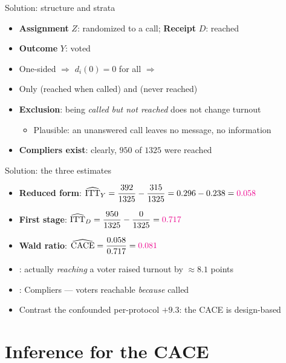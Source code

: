 \documentclass[table, xcolor = {dvipsnames}, 9pt]{beamer}
\theoremstyle{plain}
\newcommand{\mh}[1]{{\color{magenta}{#1}}}
\newcommand{\CACE}{\mathrm{CACE}}
\newcommand{\hITTY}{\widehat{\mathrm{ITT}}_Y}
\newcommand{\hITTD}{\widehat{\mathrm{ITT}}_D}
\begin{document}
\begin{frame}[t]{Solution: structure and strata}
\vfill
\begin{itemize} \vfill
\item \textbf{Assignment} $Z$: randomized to a call; \textbf{Receipt} $D$: reached \vfill
\item[] \textbf{Outcome} $Y$: voted \vfill
\item One-sided $\Rightarrow$ $d_i(0) = 0$ for all $\Rightarrow$ \mh{no Always-Takers, no Defiers} \vfill
\item Only \mh{Compliers} (reached when called) and \mh{Never-Takers} (never reached) \vfill
\item \textbf{Exclusion}: being \emph{called but not reached} does not change turnout \vfill
\begin{itemize} \vfill
\item Plausible: an unanswered call leaves no message, no information \vfill
\end{itemize} \vfill
\item \textbf{Compliers exist}: clearly, $950$ of $1325$ were reached \vfill
\end{itemize} \vfill
\end{frame}
\begin{frame}[t]{Solution: the three estimates}
\vfill
\begin{itemize} \vfill
\item \textbf{Reduced form}: $\hITTY = \dfrac{392}{1325} - \dfrac{315}{1325} = 0.296 - 0.238 = \mh{0.058}$ \vfill
\item \textbf{First stage}: $\hITTD = \dfrac{950}{1325} - \dfrac{0}{1325} = \mh{0.717}$ \vfill
\item \textbf{Wald ratio}: $\widehat{\CACE} = \dfrac{0.058}{0.717} = \mh{0.081}$ \vfill
\item \mh{Interpretation}: actually \emph{reaching} a voter raised turnout by $\approx 8.1$ points \vfill
\item \mh{Population}: Compliers --- voters reachable \emph{because} called \vfill
\item Contrast the confounded per-protocol $+9.3$: the CACE is design-based \vfill
\end{itemize} \vfill
\end{frame}
\section{Inference for the CACE}
\end{document}
